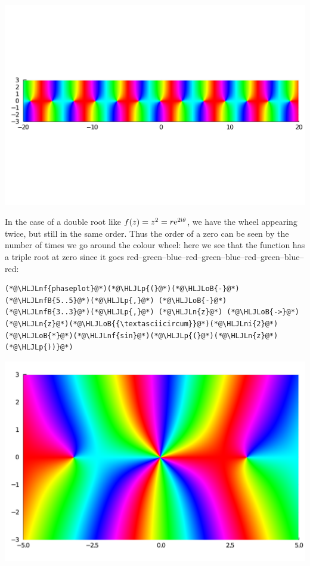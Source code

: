 \documentclass[12pt,a4paper]{article}
\newcommand{\HLJLn}[1]{#1}
\newcommand{\HLJLnf}[1]{\textcolor[RGB]{66,102,213}{#1}}
\newcommand{\HLJLnfB}[1]{\textcolor[RGB]{59,151,46}{#1}}
\newcommand{\HLJLni}[1]{\textcolor[RGB]{59,151,46}{#1}}
\newcommand{\HLJLoB}[1]{\textcolor[RGB]{102,102,102}{\textbf{#1}}}
\newcommand{\HLJLp}[1]{#1}
\def\I{ {\rm i} }
\def\E{ {\rm e} }
\def\endash{–}
\begin{document}
\includegraphics[width=\linewidth]{jl_z7eR69/Lecture1_7_1.pdf}

In the case of a double root like $f(z) = z^2 = r \E^{2 \I \theta}$, we have the wheel appearing twice, but still in the same order. Thus the order of a zero can be seen by the number of times we go around the colour wheel: here we see that the function has a triple root at zero since it goes red\ensuremath{\endash}green\ensuremath{\endash}blue\ensuremath{\endash}red\ensuremath{\endash}green\ensuremath{\endash}blue\ensuremath{\endash}red\ensuremath{\endash}green\ensuremath{\endash}blue\ensuremath{\endash}red:


\begin{lstlisting}
(*@\HLJLnf{phaseplot}@*)(*@\HLJLp{(}@*)(*@\HLJLoB{-}@*)(*@\HLJLnfB{5..5}@*)(*@\HLJLp{,}@*) (*@\HLJLoB{-}@*)(*@\HLJLnfB{3..3}@*)(*@\HLJLp{,}@*) (*@\HLJLn{z}@*) (*@\HLJLoB{->}@*) (*@\HLJLn{z}@*)(*@\HLJLoB{{\textasciicircum}}@*)(*@\HLJLni{2}@*)(*@\HLJLoB{*}@*)(*@\HLJLnf{sin}@*)(*@\HLJLp{(}@*)(*@\HLJLn{z}@*)(*@\HLJLp{))}@*)
\end{lstlisting}

\includegraphics[width=\linewidth]{jl_z7eR69/Lecture1_8_1.pdf}
\end{document}
